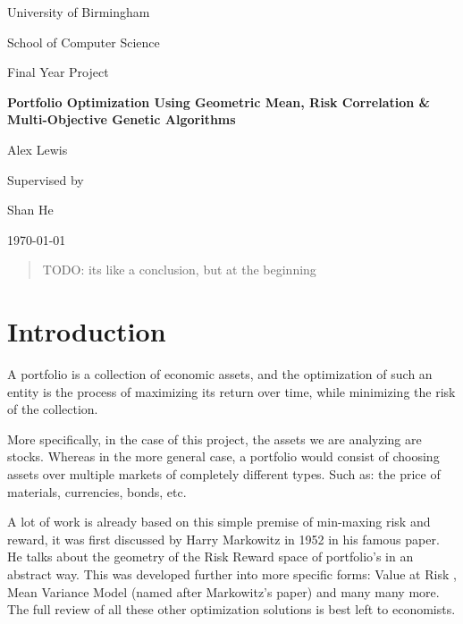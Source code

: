 \documentclass[12pt]{article}
\begin{document}
\begin{titlingpage}
    \centering\par
    {\huge University of Birmingham\par}
    {\small School of Computer Science\par}
        \vspace{0.9cm}
    {\Large Final Year Project\par}
        \vspace{0.9cm}
    {\Huge\bfseries Portfolio Optimization Using Geometric Mean, Risk Correlation 
        \& Multi-Objective Genetic Algorithms\par}
        \vspace{2.5cm}
    {\Large Alex Lewis\par}
        \vspace{0.9cm}
    {\tiny Supervised by\par}
    {\Large Shan He\par}
        \vspace{0.9cm}
    {\large \today \par}
        \vspace{0.2cm}
        \hrulefill
    \begin{abstract}
            TODO: its like a conclusion, but at the beginning
    \end{abstract}
\end{titlingpage}

\section{Introduction}

    A portfolio is a collection of economic assets, and the optimization of such an
    entity is the process of maximizing its return over time, while minimizing the
    risk of the collection.

    More specifically, in the case of this project, the assets we are analyzing are
    stocks. Whereas in the more general case, a portfolio would consist of choosing
    assets over multiple markets of completely different types. Such as: the price of 
    materials, currencies, bonds, etc. 

    A lot of work is already based on this simple premise of min-maxing risk and
    reward, it was first discussed by Harry Markowitz in 1952 \cite{Markowitz}
    in his famous paper. He talks about the geometry of the Risk Reward space
    of portfolio's in an abstract way. This was developed further into more specific
    forms: Value at Risk \cite{ValueAtRisk, Ghaoui}, Mean Variance Model (named
    after Markowitz's paper) \cite{Markowitz, Robert, SidWard} and many many more.
    The full review of all these other optimization solutions is best left
    to economists.
\end{document}
